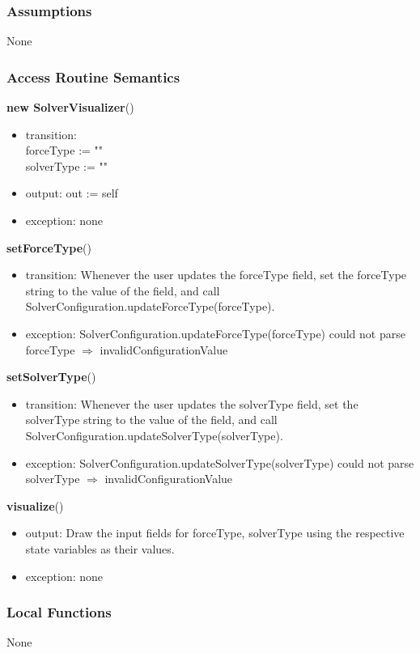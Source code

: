 \documentclass[12pt, titlepage]{article}
\begin{document}
\subsubsection{Assumptions}
None
\subsubsection{Access Routine Semantics}

\noindent \textbf{new SolverVisualizer}()
\begin{itemize}
\item transition: \\
        forceType := ""\\
		solverType := ""
\item output: out := self
\item exception: none
\end{itemize}

\noindent \textbf{setForceType}()
\begin{itemize}
\item transition: Whenever the user updates the forceType field, set the forceType string to the value of the field, and call SolverConfiguration.updateForceType(forceType).
\item exception: SolverConfiguration.updateForceType(forceType) could not parse forceType $\Rightarrow$ invalidConfigurationValue
\end{itemize}

\noindent \textbf{setSolverType}()
\begin{itemize}
\item transition: Whenever the user updates the solverType field, set the solverType string to the value of the field, and call SolverConfiguration.updateSolverType(solverType).
\item exception: SolverConfiguration.updateSolverType(solverType) could not parse solverType $\Rightarrow$ invalidConfigurationValue
\end{itemize}

\noindent \textbf{visualize}()
\begin{itemize}
\item output: Draw the input fields for forceType, solverType using the respective state variables as their values.
\item exception: none
\end{itemize}
\subsubsection{Local Functions}
None
\end{document}
